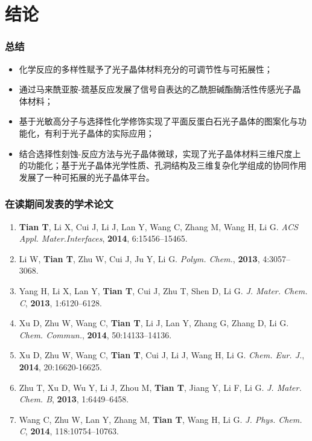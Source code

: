 \documentclass{beamer}
\begin{document}
\section{结论}
\begin{frame}
  \frametitle{总结}
  \begin{itemize}
    \item
    化学反应的多样性赋予了光子晶体材料充分的可调节性与可拓展性；
    \item
    通过马来酰亚胺-巯基反应发展了信号自表达的乙酰胆碱酯酶活性传感光子晶体材料；
    \item
    基于光敏高分子与选择性化学修饰实现了平面反蛋白石光子晶体的图案化与功能化，有利于光子晶体的实际应用；
    \item
    结合选择性刻蚀-反应方法与光子晶体微球，实现了光子晶体材料三维尺度上的功能化；基于光子晶体光学性质、孔洞结构及三维复杂化学组成的协同作用发展了一种可拓展的光子晶体平台。
  \end{itemize}
\end{frame}

\begin{frame}
  \frametitle{在读期间发表的学术论文}
  {
  \begin{enumerate}
  \scriptsize
  \item \textbf{Tian T}, Li X, Cui J, Li J, Lan Y, Wang C, Zhang M, Wang H, Li G. \textit{ACS Appl. Mater.Interfaces}, \textbf{2014}, 6:15456–15465. 
  
  \item Li W, \textbf{Tian T}, Zhu W, Cui J, Ju Y, Li G. \textit{Polym. Chem.}, \textbf{2013}, 4:3057–3068.
  
  \item Yang H, Li X, Lan Y, \textbf{Tian T}, Cui J, Zhu T, Shen D, Li G. \textit{J. Mater. Chem. C}, \textbf{2013}, 1:6120–6128.
  
  \item Xu D, Zhu W, Wang C, \textbf{Tian T}, Li J, Lan Y, Zhang G, Zhang D, Li G. \textit{Chem. Commun.}, \textbf{2014}, 50:14133–14136.
  
  \item Xu D, Zhu W, Wang C, \textbf{Tian T}, Cui J, Li J, Wang H, Li G. \textit{Chem. Eur. J.}, \textbf{2014}, 20:16620-16625.
  
  \item Zhu T, Xu D, Wu Y, Li J, Zhou M, \textbf{Tian T}, Jiang Y, Li F, Li G. \textit{J. Mater. Chem. B}, \textbf{2013}, 1:6449–6458.
  
  \item Wang C, Zhu W, Lan Y, Zhang M, \textbf{Tian T}, Wang H, Li G. \textit{J. Phys. Chem. C}, \textbf{2014}, 118:10754–10763.

  \end{enumerate}
  }
\end{frame}
\end{document}
